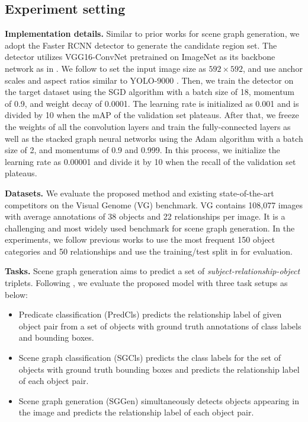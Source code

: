 \documentclass[10pt,twocolumn,letterpaper]{article}
\begin{document}
\subsection{Experiment setting}

\noindent\textbf{Implementation details. }Similar to prior works \cite{xu2017scene,zellers2017neural} for scene graph generation, we adopt the Faster RCNN detector \cite{ren2015faster} to generate the candidate region set. The detector utilizes VGG16-ConvNet \cite{simonyan2015very} pretrained on ImageNet \cite{russakovsky2015imagenet} as its backbone network as in \cite{xu2017scene,zellers2017neural}. We follow \cite{zellers2017neural} to set the input image size as $592 \times 592$, and use anchor scales and aspect ratios similar to YOLO-9000 \cite{redmon2017yolo9000}. Then, we train the detector on the target dataset using the SGD algorithm with a batch size of 18, momentum of 0.9, and weight decay of 0.0001. The learning rate is initialized as 0.001 and is divided by 10 when the mAP of the validation set plateaus. After that, we freeze the weights of all the convolution layers and train the fully-connected layers as well as the stacked graph neural networks using the Adam algorithm with a batch size of 2, and momentums of 0.9 and 0.999. In this process, we initialize the learning rate as 0.00001 and divide it by 10 when the recall of the validation set plateaus.


\noindent\textbf{Datasets. }We evaluate the proposed method and existing state-of-the-art competitors on the Visual Genome (VG) \cite{krishna2017visual} benchmark. VG contains 108,077 images with average annotations of 38 objects and 22 relationships per image. It is a challenging and most widely used benchmark for scene graph generation. In the experiments, we follow previous works \cite{zellers2017neural,xu2017scene} to use the most frequent 150 object categories and 50 relationships and use the training/test split in \cite{xu2017scene} for evaluation.

\noindent\textbf{Tasks. }Scene graph generation aims to predict a set of \emph{subject-relationship-object} triplets. Following \cite{xu2017scene}, we evaluate the proposed model with three task setups as below: 

\begin{itemize}
  \item Predicate classification (PredCls) predicts the relationship label of given object pair from a set of objects with ground truth annotations of class labels and bounding boxes.  
  \item Scene graph classification (SGCls) predicts the class labels for the set of objects with ground truth bounding boxes and predicts the relationship label of each object pair. 
  \item Scene graph generation (SGGen) simultaneously detects objects appearing in the image and predicts the relationship label of each object pair.
\end{itemize}
\end{document}
